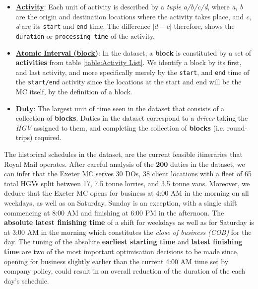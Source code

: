 
\begin{itemize}
    \item \underline{\textbf{Activity}}: Each unit of activity is described by a \textit{tuple}\textit{ a/b/c/d}, where \textit{a}, \textit{b} are the origin and destination locations where the activity takes place, and \textit{c}, \textit{d} are its \texttt{start} and \texttt{end} time. The difference $|d-c|$ therefore, shows the \texttt{duration} or \texttt{processing time} of the activity. 
    
    \item \underline{\textbf{Atomic Interval (block)}}: In the dataset, a \textbf{block} is constituted by a set of \textbf{activities} from table \ref{table:Activity List}. We identify a block by its first, and last activity, and more specifically merely by the \texttt{start}, and \texttt{end} time of the \texttt{start/end} activity since the locations at the start and end will be the MC itself, by the definition of a block.
    
    
        \item \underline{\textbf{Duty}}: The largest unit of time seen in the dataset that consists of a collection of \textbf{blocks}. Duties in the dataset correspond to a \textit{driver} taking the \textit{HGV} assigned to them, and completing the collection of \textbf{blocks} (i.e. round-trips) required.
\end{itemize}

\vspace{\baselineskip}
\noindent
The historical schedules in the dataset, are the current feasible itineraries that Royal Mail operates. After careful analysis of the \textbf{200} duties in the dataset, we can infer that the Exeter MC serves 30 DOs,  38 client locations with a fleet of  65 total HGVs split between 17, 7.5 tonne lorries, and 3.5 tonne vans. Moreover, we deduce that the Exeter MC opens for business at 4:00 AM in the morning on all weekdays, as well as on Saturday.  Sunday is an exception, with a single shift commencing at 8:00 AM and finishing at 6:00 PM in the afternoon. The \textbf{absolute latest finishing time} of a shift for weekdays as well as for Saturday is at 3:00 AM in the morning which constitutes the \textit{close of business (COB)} for the day. The tuning of the absolute \textbf{earliest starting time} and \textbf{latest finishing time} are two of the most important optimisation decisions to be made since, opening for business slightly earlier than the current 4:00 AM time set by company policy, could result in an overall reduction of the duration of the each day's schedule.


